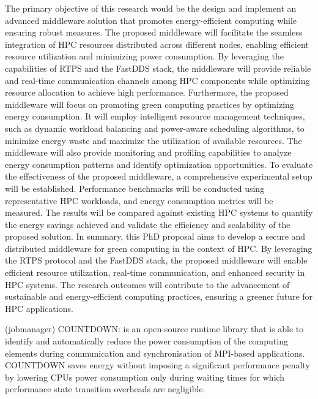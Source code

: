 The primary objective of this research would be the design and implement an advanced middleware solution that promotes energy-efficient computing while ensuring robust measures. The proposed middleware will facilitate the seamless integration of HPC resources distributed across different nodes, enabling efficient resource utilization and minimizing power consumption. By leveraging the capabilities of RTPS and the FastDDS stack, the middleware will provide reliable and real-time communication channels among HPC components while optimizing resource allocation to achieve high performance. Furthermore, the proposed middleware will focus on promoting green computing practices by optimizing energy consumption. It will employ intelligent resource management techniques, such as dynamic workload balancing and power-aware scheduling algorithms, to minimize energy waste and maximize the utilization of available resources. The middleware will also provide monitoring and profiling capabilities to analyze energy consumption patterns and identify optimization opportunities. To evaluate the effectiveness of the proposed middleware, a comprehensive experimental setup will be established. Performance benchmarks will be conducted using representative HPC workloads, and energy consumption metrics will be measured. The results will be compared against existing HPC systems to quantify the energy savings achieved and validate the efficiency and scalability of the proposed solution. In summary, this PhD proposal aims to develop a secure and distributed middleware for green computing in the context of HPC. By leveraging the RTPS protocol and the FastDDS stack, the proposed middleware will enable efficient resource utilization, real-time communication, and enhanced security in HPC systems. The research outcomes will contribute to the advancement of sustainable and energy-efficient computing practices, ensuring a greener future for HPC applications.


(jobmanager) COUNTDOWN: is an open-source runtime library that is able to identify and automatically
reduce the power consumption of the computing elements during communication and
synchronisation of MPI-based applications. COUNTDOWN saves energy without imposing a
significant performance penalty by lowering CPUs power consumption only during waiting
times for which performance state transition overheads are negligible.

